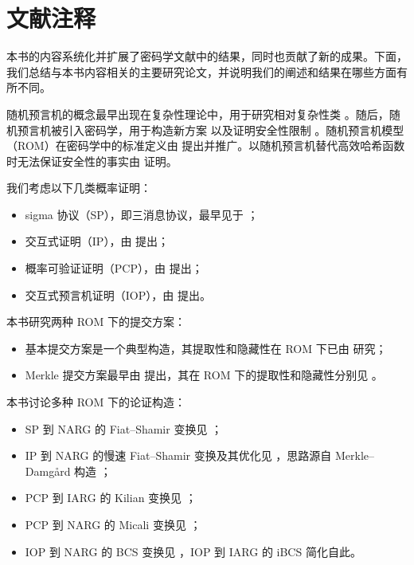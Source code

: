 \documentclass[american,singlepageview]{snargs-book-zh}
\begin{document}
\chapter{文献注释}
\label{section:bibliographic-notes}

本书的内容系统化并扩展了密码学文献中的结果，同时也贡献了新的成果。下面，我们总结与本书内容相关的主要研究论文，并说明我们的阐述和结果在哪些方面有所不同。

随机预言机的概念最早出现在复杂性理论中，用于研究相对复杂性类 \cite{BennettG81}。随后，随机预言机被引入密码学，用于构造新方案 \cite{Brassard81} 以及证明安全性限制 \cite{ImpagliazzoR89}。随机预言机模型（ROM）在密码学中的标准定义由 \cite{BellareR93} 提出并推广。以随机预言机替代高效哈希函数时无法保证安全性的事实由 \cite{CanettiGH04} 证明。

我们考虑以下几类概率证明：
\begin{itemize}[nolistsep]
  \item sigma 协议（SP），即三消息协议，最早见于 \cite{Schnorr89,Cramer97}；
  \item 交互式证明（IP），由 \cite{GoldwasserMR89,Babai85} 提出；
  \item 概率可验证证明（PCP），由 \cite{BabaiFLS91,FeigeGLSS96,AroraS98,AroraLMSS98} 提出；
  \item 交互式预言机证明（IOP），由 \cite{BenSassonCS16,ReingoldRR21} 提出。
\end{itemize}

本书研究两种 ROM 下的提交方案：
\begin{itemize}[nolistsep]
  \item 基本提交方案是一个典型构造，其提取性和隐藏性在 ROM 下已由 \cite{Pass03} 研究；
  \item Merkle 提交方案最早由 \cite{Merkle89-tree} 提出，其在 ROM 下的提取性和隐藏性分别见 \cite{Valiant08,BenSassonCS16}。
\end{itemize}

本书讨论多种 ROM 下的论证构造：
\begin{itemize}[nolistsep]
  \item SP 到 NARG 的 Fiat–Shamir 变换见 \cite{FiatS86}；
  \item IP 到 NARG 的慢速 Fiat–Shamir 变换及其优化见 ，思路源自 Merkle–Damgård 构造 \cite{Damgard89,Merkle89-hash}；
  \item PCP 到 IARG 的 Kilian 变换见 \cite{Kilian92}；
  \item PCP 到 NARG 的 Micali 变换见 \cite{Micali00}；
  \item IOP 到 NARG 的 BCS 变换见 \cite{BenSassonCS16}，IOP 到 IARG 的 iBCS 简化自此。
\end{itemize}
\end{document}
